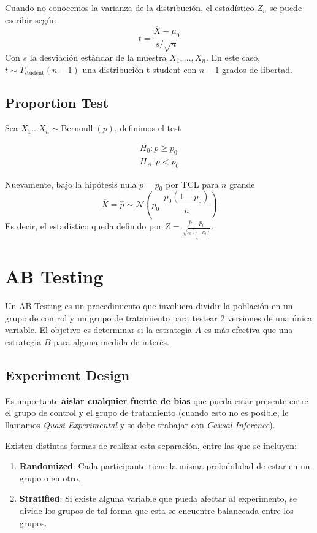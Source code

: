 Cuando no conocemos la varianza de la distribución, el estadístico $Z_n$ se puede escribir según 
$$ 
t = \frac{\overline{X} - \mu_0}{s / \sqrt{n}}
$$
Con $s$ la desviación estándar de la muestra $X_1 , \dots, X_n$. En este caso, $t \sim T_{\text{student}}(n-1)$ una distribución t-student con $n-1$ grados de libertad. 

\subsection{Proportion Test}

Sea $X_1 \dots X_n \sim \text{Bernoulli}(p)$, definimos el test 

\begin{equation*}
\begin{aligned}
    H_0: p \geq p_0 \\ 
    H_A: p < p_0
\end{aligned}
\end{equation*}

Nuevamente, bajo la hipótesis nula $p = p_0$ por TCL para $n$ grande
$$ 
\overline{X} = \hat{p} \sim \mathcal{N} \left ( p_0 , \frac{p_0(1-p_0)}{n} \right )
$$
Es decir, el estadístico queda definido por $Z = \frac{\hat{p} - p_0}{\frac{\sqrt{p_0(1-p_0)}}{n}}$. 

\section{AB Testing}

Un AB Testing es un procedimiento que involucra dividir la población en un grupo de control y un grupo de tratamiento para testear 2 versiones de una única variable. El objetivo es determinar si la estrategia $A$ es más efectiva que una estrategia $B$ para alguna medida de interés.

\subsection{Experiment Design}

Es importante \textbf{aislar cualquier fuente de bias} que pueda estar presente entre el grupo de control y el grupo de tratamiento (cuando esto no es posible, le llamamos \textit{Quasi-Experimental} y se debe trabajar con \textit{Causal Inference}). 

Existen distintas formas de realizar esta separación, entre las que se incluyen: 

\begin{enumerate}
    \item \textbf{Randomized}: Cada participante tiene la misma probabilidad de estar en un grupo o en otro. 
     \item \textbf{Stratified}: Si existe alguna variable que pueda afectar al experimento, se divide los grupos de tal forma que esta se encuentre balanceada entre los grupos. 
\end{enumerate}

